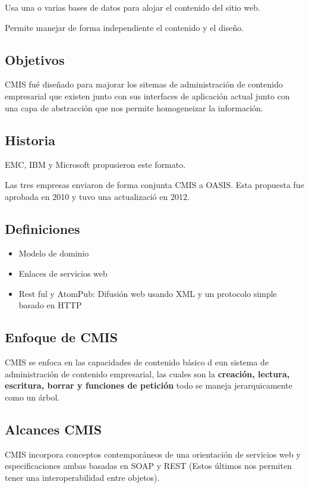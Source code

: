 Usa una o varias bases de datos para alojar el contenido del sitio web.

Permite manejar de forma independiente el contenido y el diseño.

\subsection{Objetivos}

CMIS fué diseñado para majorar los sitemas de administración de contenido empresarial que existen junto con sus interfaces de aplicación actual junto con una capa de abstracción que nos permite homogeneizar la información.

\subsection{Historia}
EMC, IBM y Microsoft propusieron este formato.

Las tres empresas enviaron de forma conjunta CMIS a OASIS. Esta propuesta fue aprobada en 2010 y tuvo una actualizació en 2012. 

\subsection{Definiciones}
\begin{itemize}
    \item Modelo de dominio
    \item Enlaces de servicios web
    \item Rest ful y AtomPub: Difusión web usando XML y un protocolo simple basado en HTTP
\end{itemize}

\subsection{ Enfoque de CMIS }
CMIS se enfoca en las capacidades de contenido básico d eun sistema de administración de contenido empresarial, las cuales son la \textbf{creación, lectura, escritura, borrar y funciones de petición} todo se maneja jerarquicamente como un árbol. 

\subsection{Alcances CMIS}
CMIS incorpora conceptos contemporáneos de una orientación de servicios web y especificaciones ambas basadas en SOAP y REST (Estos últimos nos permiten tener una interoperabilidad entre objetos). 

